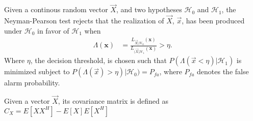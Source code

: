 \documentclass[a4paper, openany, oneside]{memoir}
\begin{document}


\begin{blockDefinition}
Given a continous random vector $\vec{X}$, and two hypotheses $\mathcal{H}_0$ and $\mathcal{H}_1$, the Neyman-Pearson test rejects that the realization of $\vec{X}$, $\vec{x}$, has been produced under $\mathcal{H}_0$ in favor of $\mathcal{H}_1$
when
\begin{align*}
    \Lambda (\mathbf{x}) &= \frac{L_{\vec{X} | \mathcal{H}_0} (\mathbf{x})}{L_{(\vec{X} | \mathcal{H}_1}(\mathbf{x})} > \eta. 
\end{align*}
Where $\eta$, the decision threshold, is chosen such that $P(\Lambda(\vec{x} < \eta) | \mathcal{H}_1)$ is minimized subject to $P(\Lambda(\vec{x}) > \eta) | \mathcal{H}_0) = P_{fa}$, where $P_{fa}$ denotes the false alarm probability. %
\end{blockDefinition}

\begin{blockDefinition}
Given a vector $\vec{X}$, its covariance matrix is defined as $C_{X} = E\left[XX^H\right]-E\left[X\right]E\left[X^H\right]$
\end{blockDefinition}
\end{document}
